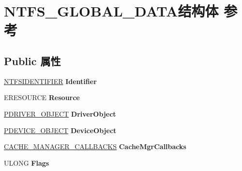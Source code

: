 \hypertarget{struct_n_t_f_s___g_l_o_b_a_l___d_a_t_a}{}\section{N\+T\+F\+S\+\_\+\+G\+L\+O\+B\+A\+L\+\_\+\+D\+A\+T\+A结构体 参考}
\label{struct_n_t_f_s___g_l_o_b_a_l___d_a_t_a}
\subsection*{Public 属性}
\begin{DoxyCompactItemize}
\item 
\mbox{\label{struct_n_t_f_s___g_l_o_b_a_l___d_a_t_a_a9e095731957190107bdad1b7e1d7841e}} 
\hyperlink{struct_n_t_f_s_i_d_e_n_t_i_f_i_e_r}{N\+T\+F\+S\+I\+D\+E\+N\+T\+I\+F\+I\+ER} {\bfseries Identifier}
\item 
\mbox{\label{struct_n_t_f_s___g_l_o_b_a_l___d_a_t_a_a57c3df6832625c22f38198a3e9b779b4}} 
E\+R\+E\+S\+O\+U\+R\+CE {\bfseries Resource}
\item 
\mbox{\label{struct_n_t_f_s___g_l_o_b_a_l___d_a_t_a_afb730aa1a438354300aa7c96e5398cd3}} 
\hyperlink{struct___d_r_i_v_e_r___o_b_j_e_c_t}{P\+D\+R\+I\+V\+E\+R\+\_\+\+O\+B\+J\+E\+CT} {\bfseries Driver\+Object}
\item 
\mbox{\label{struct_n_t_f_s___g_l_o_b_a_l___d_a_t_a_a5f00ab580c7c27a527e0d5749d3906f2}} 
\hyperlink{struct___d_e_v_i_c_e___o_b_j_e_c_t}{P\+D\+E\+V\+I\+C\+E\+\_\+\+O\+B\+J\+E\+CT} {\bfseries Device\+Object}
\item 
\mbox{\label{struct_n_t_f_s___g_l_o_b_a_l___d_a_t_a_ae5e70422b1e1a20b589ec63a9bad3bed}} 
\hyperlink{struct___c_a_c_h_e___m_a_n_a_g_e_r___c_a_l_l_b_a_c_k_s}{C\+A\+C\+H\+E\+\_\+\+M\+A\+N\+A\+G\+E\+R\+\_\+\+C\+A\+L\+L\+B\+A\+C\+KS} {\bfseries Cache\+Mgr\+Callbacks}
\item 
\mbox{\label{struct_n_t_f_s___g_l_o_b_a_l___d_a_t_a_a446db26b11ce5a3d1703980877a57f0d}} 
U\+L\+O\+NG {\bfseries Flags}

\end{DoxyCompactItemize}
